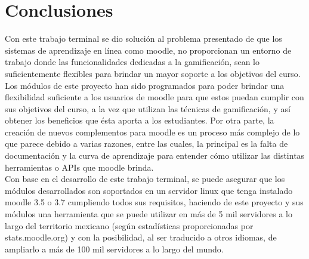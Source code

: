 
\section{Conclusiones}

\noindent Con este trabajo terminal se dio solución al problema presentado de que los sistemas de aprendizaje en línea como moodle, no proporcionan un entorno de trabajo donde las funcionalidades dedicadas a la gamificación, sean lo suficientemente flexibles
para brindar un mayor soporte a los objetivos del curso. Los módulos de este proyecto han sido programados para poder brindar una flexibilidad suficiente a los usuarios de moodle para que estos puedan cumplir con sus objetivos del curso, a la vez que utilizan las técnicas de gamificación, y así obtener los beneficios que ésta aporta a los estudiantes.  Por otra parte, la creación de nuevos complementos para moodle es un proceso más complejo de lo que parece debido a varias razones, entre las cuales, la principal es la falta de documentación y la curva de aprendizaje para entender cómo utilizar las distintas herramientas o APIs que moodle brinda.\\

\noindent Con base en el desarrollo de este trabajo terminal, se puede asegurar que
los módulos desarrollados son soportados en un servidor linux que tenga instalado
moodle 3.5 o 3.7 cumpliendo todos sus requisitos, haciendo de este proyecto y sus
módulos una herramienta que se puede utilizar en más de 5 mil servidores a lo largo
del territorio mexicano (según estadísticas proporcionadas por stats.moodle.org) y con la posibilidad, al ser traducido a otros idiomas, de ampliarlo a más de 100 mil servidores a lo largo del mundo.
\vfill\null

